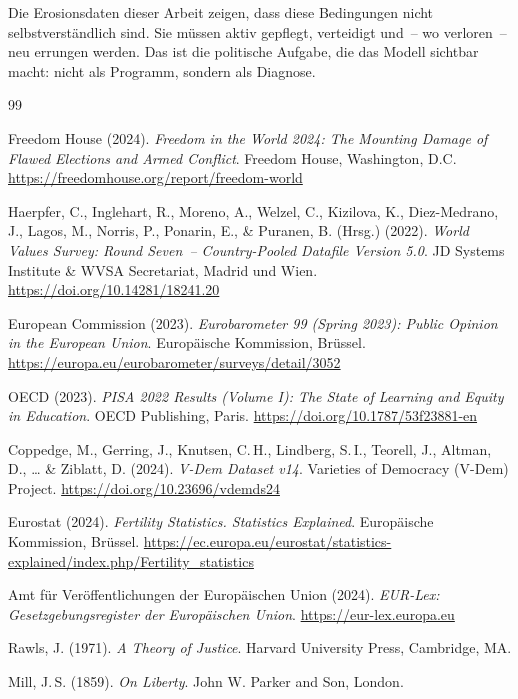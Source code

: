﻿\documentclass[a4paper,12pt]{article}
\theoremstyle{definition}
\begin{document}
Die Erosionsdaten dieser Arbeit zeigen, dass diese Bedingungen nicht selbstverständlich sind. Sie müssen aktiv gepflegt, verteidigt und~-- wo verloren~-- neu errungen werden. Das ist die politische Aufgabe, die das Modell sichtbar macht: nicht als Programm, sondern als Diagnose.

\begin{thebibliography}{99}

Freedom House (2024).
\textit{Freedom in the World 2024: The Mounting Damage of Flawed Elections and Armed Conflict}.
Freedom House, Washington, D.C.
\url{https://freedomhouse.org/report/freedom-world}

Haerpfer, C., Inglehart, R., Moreno, A., Welzel, C., Kizilova, K., Diez-Medrano, J., Lagos, M., Norris, P., Ponarin, E., \& Puranen, B. (Hrsg.) (2022).
\textit{World Values Survey: Round Seven~-- Country-Pooled Datafile Version 5.0}.
JD Systems Institute \& WVSA Secretariat, Madrid und Wien.
\url{https://doi.org/10.14281/18241.20}

European Commission (2023).
\textit{Eurobarometer 99 (Spring 2023): Public Opinion in the European Union}.
Europäische Kommission, Brüssel.
\url{https://europa.eu/eurobarometer/surveys/detail/3052}

OECD (2023).
\textit{PISA 2022 Results (Volume I): The State of Learning and Equity in Education}.
OECD Publishing, Paris.
\url{https://doi.org/10.1787/53f23881-en}

Coppedge, M., Gerring, J., Knutsen, C.\,H., Lindberg, S.\,I., Teorell, J.,
Altman, D., \ldots{} \& Ziblatt, D. (2024).
\textit{V-Dem Dataset v14}.
Varieties of Democracy (V-Dem) Project.
\url{https://doi.org/10.23696/vdemds24}

Eurostat (2024).
\textit{Fertility Statistics. Statistics Explained}.
Europäische Kommission, Brüssel.
\url{https://ec.europa.eu/eurostat/statistics-explained/index.php/Fertility_statistics}

Amt für Veröffentlichungen der Europäischen Union (2024).
\textit{EUR-Lex: Gesetzgebungsregister der Europäischen Union}.
\url{https://eur-lex.europa.eu}

Rawls, J. (1971).
\textit{A Theory of Justice}.
Harvard University Press, Cambridge, MA.

Mill, J.\,S. (1859).
\textit{On Liberty}.
John W. Parker and Son, London.


\end{thebibliography}
\end{document}
